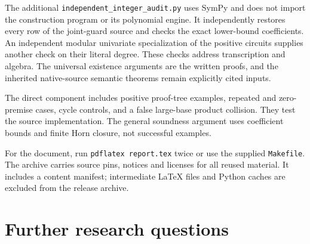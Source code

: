 \documentclass[11pt,letterpaper]{article}
\theoremstyle{definition}
\theoremstyle{remark}
\begin{document}
The additional \texttt{independent\_integer\_audit.py} uses SymPy and
does not import the construction program or its polynomial engine. It
independently restores every row of the joint-guard source and checks
the exact lower-bound coefficients. An independent modular univariate
specialization of the positive circuits supplies another check on their
literal degree. These checks address transcription and algebra. The
universal existence arguments are the written proofs, and the inherited
native-source semantic theorems remain explicitly cited inputs.

The direct component includes positive proof-tree examples, repeated and
zero-premise cases, cycle controls, and a false large-base product collision.
They test the source implementation. The general soundness argument uses
coefficient bounds and finite Horn closure, not successful examples.

For the document, run \texttt{pdflatex report.tex} twice or use the supplied
\texttt{Makefile}. The archive carries source pins, notices and licenses
for all reused material. It includes a content manifest; intermediate
LaTeX files and Python caches are excluded from the release archive.

\section{Further research questions}
\label{sec:questions}
\end{document}
